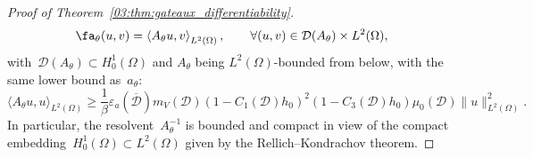 \begin{proof}[Proof of Theorem~\ref{03:thm:gateaux_differentiability}]
    \begin{equation}
        \label{03:eq:def_a_theta}
        \fa_\theta(u,v) = \left\langle A_\theta u,v\right\rangle_{L^2(\Omega)},\qquad \forall (u,v)\in \mathcal D(A_\theta)\times L^2(\Omega),
    \end{equation}
    with~$\mathcal D(A_\theta)\subset H_0^1(\Omega)$ and $A_\theta$ being $L^2(\Omega)$-bounded from below, with the same lower bound as~$a_\theta$:
    \begin{equation}
        \label{03:eq:A_lower_bound}
        \langle A_\theta u,u\rangle_{L^2(\Omega)} \geq \frac1\beta\varepsilon_a(\overline{\mathcal D}) m_V(\mathcal D) (1-C_1(\mathcal D)h_0)^2(1-C_3(\mathcal D)h_0) \mu_0(\mathcal D)\|u\|^2_{L^2(\Omega)}.
    \end{equation}
    In particular, the resolvent~$A_\theta^{-1}$ is bounded and compact in view of the compact embedding~$H_0^1(\Omega)\subset L^2(\Omega)$ given by the Rellich--Kondrachov theorem.


\end{proof}
